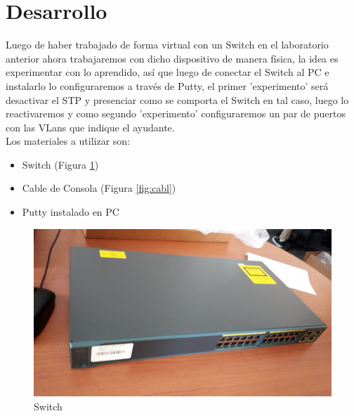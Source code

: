 \documentclass{article}
\begin{document}
\section{Desarrollo\vspace{0.5cm}}
Luego de haber trabajado de forma virtual con un Switch en el laboratorio anterior ahora trabajaremos con dicho dispositivo de manera física, la idea es experimentar con lo aprendido, así que luego de conectar el Switch al PC e instalarlo lo configuraremos a través de Putty, el primer 'experimento' será desactivar el STP y presenciar como se comporta el Switch en tal caso, luego lo reactivaremos y como segundo 'experimento' configuraremos un par de puertos con las VLans que indique el ayudante.\\
Los materiales a utilizar son:
\begin{itemize}
    \item Switch (Figura \ref{fig:Swi})
    \item Cable de Consola (Figura \ref{fig:cabl})
    \item Putty instalado en PC
\end{itemize}
\begin{figure}[h!]
\centering
\includegraphics[scale = 0.15]{SwitchDel.jpg}
\caption{Switch}
\label{fig:Swi}
\end{figure}
\end{document}
